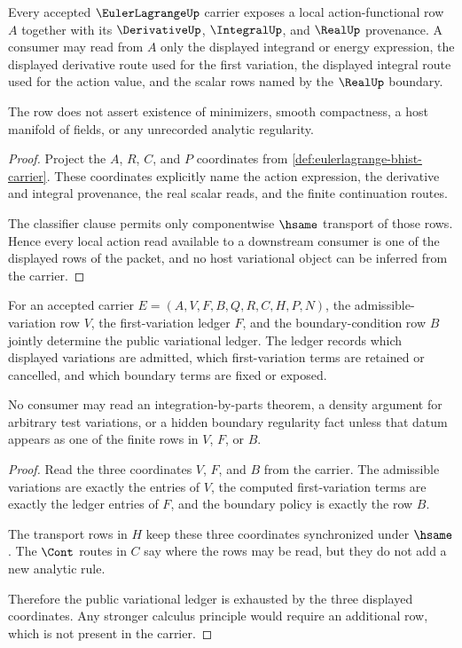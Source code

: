 \begin{theorem}
\label{thm:eulerlagrange-local-action-row}
Every accepted $\EulerLagrangeUp$ carrier exposes a local action-functional row $A$ together with its $\DerivativeUp$, $\IntegralUp$, and $\RealUp$ provenance. A consumer may read from $A$ only the displayed integrand or energy expression, the displayed derivative route used for the first variation, the displayed integral route used for the action value, and the scalar rows named by the $\RealUp$ boundary.

The row does not assert existence of minimizers, smooth compactness, a host manifold of fields, or any unrecorded analytic regularity.
\end{theorem}
\begin{proof}
Project the $A$, $R$, $C$, and $P$ coordinates from \autoref{def:eulerlagrange-bhist-carrier}. These coordinates explicitly name the action expression, the derivative and integral provenance, the real scalar reads, and the finite continuation routes.

The classifier clause permits only componentwise $\hsame$ transport of those rows. Hence every local action read available to a downstream consumer is one of the displayed rows of the packet, and no host variational object can be inferred from the carrier.
\end{proof}

\begin{theorem}
\label{thm:eulerlagrange-variation-ledger-boundary}
For an accepted carrier $E=(A,V,F,B,Q,R,C,H,P,N)$, the admissible-variation row $V$, the first-variation ledger $F$, and the boundary-condition row $B$ jointly determine the public variational ledger. The ledger records which displayed variations are admitted, which first-variation terms are retained or cancelled, and which boundary terms are fixed or exposed.

No consumer may read an integration-by-parts theorem, a density argument for arbitrary test variations, or a hidden boundary regularity fact unless that datum appears as one of the finite rows in $V$, $F$, or $B$.
\end{theorem}
\begin{proof}
Read the three coordinates $V$, $F$, and $B$ from the carrier. The admissible variations are exactly the entries of $V$, the computed first-variation terms are exactly the ledger entries of $F$, and the boundary policy is exactly the row $B$.

The transport rows in $H$ keep these three coordinates synchronized under $\hsame$. The $\Cont$ routes in $C$ say where the rows may be read, but they do not add a new analytic rule.

Therefore the public variational ledger is exhausted by the three displayed coordinates. Any stronger calculus principle would require an additional row, which is not present in the carrier.
\end{proof}


